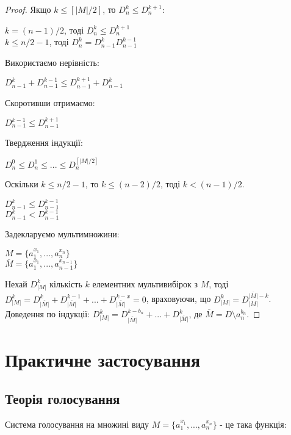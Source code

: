 \begin{proof}
Якщо $k \leq [|M|/2]$, то $D_n^k \leq D_n^{k+1}$:
\begin{center}
$k = (n-1)/2$, тоді $D_n^k \leq D_n^{k+1}$
\\
$k \leq n/2 - 1$, тоді $D_n^k = D_{n-1}^k D_{n-1}^{k-1}$
\end{center}
Використаємо нерівність:
\begin{center}
$D_{n-1}^k + D_{n-1}^{k-1} \leq D_{n-1}^{k+1} + D_{n-1}^{k}$
\end{center}
Скоротивши отримаємо:
\begin{center}
$D_{n-1}^{k-1} \leq D_{n-1}^{k+1}$
\end{center}

Твердження індукції:
\begin{center}
$ D_n^0 \leq D_n^1 \leq ... \leq D_n^{[|M|/2]}$
\end{center}

Оскільки $k \leq n/2 - 1$, то $k \leq (n - 2)/2$, тоді $k < (n - 1)/2$.
\begin{center}
$D_{n-1}^{k} \leq D_{n-1}^{k-1}$
\\
$D_{n-1}^{k} < D_{n-1}^{k-1}$
\end{center}

Задекларуємо мультимножини:

\begin{center}
$M = \{a_1^{x_1}, ... , a_n^{x_n}\} $ 
\\
$\overline{M} = \{a_1^{x_1}, ... , a_{n-1}^{x_{n-1}}\} $ 
\end{center}

Нехай $D_{|M|}^k $ кількість $k$ елементних мультивибірок з $M$, тоді  $D_{|M|}^k =  D_{\overline{|M|}}^k + D_{\overline{|M|}}
^{k-1} + ... + D_{\overline{|M|}}^{k-x} = 0  $, враховуючи, що $D_{|M|}^k  = D_{|M|}^{\overline{|M|} - k}$. 
\\
Доведення по індукції: $D_{|M|}^k  = D_{\overline{|M|}}^{k-b_n} + ... + D_{\overline{|M|}}^k$, де $\overline{M} = D \setminus {a_n^{b_n}}$.

\end{proof}
\newpage

\chapter{Практичне застосування}

\section{Теорія голосування}
Система голосування на множині виду $M = \{a_1^{x_1}, ... , a_n^{x_n}\}$ - це така функція:

